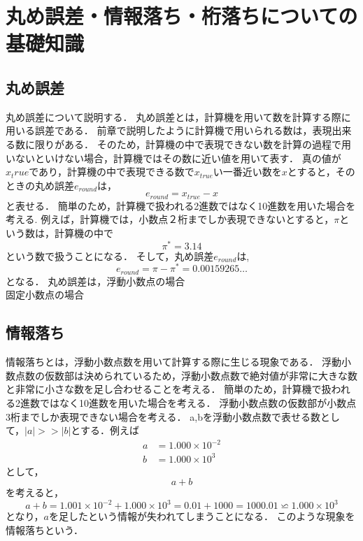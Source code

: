\chapter{丸め誤差・情報落ち・桁落ちについての基礎知識}
\label{chap:基礎知識2}
\section{丸め誤差}
丸め誤差について説明する．
丸め誤差とは，計算機を用いて数を計算する際に用いる誤差である．
前章で説明したように計算機で用いられる数は，表現出来る数に限りがある．
そのため，計算機の中で表現できない数を計算の過程で用いないといけない場合，計算機ではその数に近い値を用いて表す．
真の値が$x_true$であり，計算機の中で表現できる数で$x_{true}$い一番近い数を$x$とすると，そのときの丸め誤差$e_{round}$は，
\begin{equation}
    e_{round} = x_{true} - x
\end{equation}
と表せる．
簡単のため，計算機で扱われる2進数ではなく10進数を用いた場合を考える.
例えば，計算機では，小数点２桁までしか表現できないとすると，$\pi$という数は，計算機の中で
\begin{equation}
    \pi^{\ast} = 3.14
\end{equation}
という数で扱うことになる．
そして，丸め誤差$e_{round}$は,
\begin{equation}
    e_{round} = \pi - \pi^{\ast} = 0.00159265\dots
\end{equation}
となる．
丸め誤差は，浮動小数点の場合 \\
固定小数点の場合

\section{情報落ち}
情報落ちとは，浮動小数点数を用いて計算する際に生じる現象である．
浮動小数点数の仮数部は決められているため，浮動小数点数で絶対値が非常に大きな数と非常に小さな数を足し合わせることを考える．
簡単のため，計算機で扱われる2進数ではなく10進数を用いた場合を考える．
浮動小数点数の仮数部が小数点3桁までしか表現できない場合を考える．
a,bを浮動小数点数で表せる数として，$|a| >> |b|$とする．例えば
\begin{align}
    a &= 1.000 \times 10^{-2} \\
    b &= 1.000 \times 10^{3}
\end{align}
として，
\begin{equation}
    a + b
\end{equation}
を考えると，
\begin{equation}
    a + b = 1.001 \times 10^{-2} + 1.000 \times 10^{3} = 0.01 + 1000 = 1000.01 \backsimeq 1.000 \times 10^{3}
\end{equation}
となり，$a$を足したという情報が失われてしまうことになる．
このような現象を情報落ちという．

